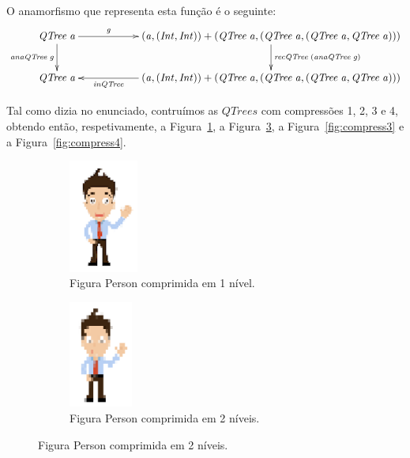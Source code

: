 \documentclass[a4paper]{article}
\newcommand{\Conid}[1]{\mathit{#1}}
\newcommand{\Varid}[1]{\mathit{#1}}
\begin{document}
\begin{enumerate}
O anamorfismo que representa esta função é o seguinte:
\begin{eqnarray}
\xymatrix@C=2cm{
    \ensuremath{\Conid{QTree}\;\Varid{a}}
        \ar[d]_-{\ensuremath{\Varid{anaQTree}\;\Varid{g}}}
        \ar[r]^-{\ensuremath{\Varid{g}}}
&
    \ensuremath{(\Varid{a},(\Conid{Int},\Conid{Int}))+(\Conid{QTree}\;\Varid{a},(\Conid{QTree}\;\Varid{a},(\Conid{QTree}\;\Varid{a},\Conid{QTree}\;\Varid{a})))}
           \ar[d]^{\ensuremath{\Varid{recQTree}\;(\Varid{anaQTree}\;\Varid{g})}}
\\
     \ensuremath{\Conid{QTree}\;\Varid{a}}
&
     \ensuremath{(\Varid{a},(\Conid{Int},\Conid{Int}))+(\Conid{QTree}\;\Varid{a},(\Conid{QTree}\;\Varid{a},(\Conid{QTree}\;\Varid{a},\Conid{QTree}\;\Varid{a})))}
           \ar[l]^-{\ensuremath{\Varid{inQTree}}}
}
\end{eqnarray}


Tal como dizia no enunciado, contruímos as \ensuremath{\Conid{QTrees}} com compressões 1, 2, 3 e 4,
obtendo então, respetivamente, a Figura~\ref{fig:compress1},
a Figura~\ref{fig:compress2}, a Figura~\ref{fig:compress3}
e a Figura~\ref{fig:compress4}.

\begin{figure}
\begin{subfigure}{0.4\textwidth}
    \begin{center}
    \includegraphics[width=0.25\textwidth]{imgs/compress1.png}
    \end{center}
    \caption{Figura Person comprimida em 1 nível.}
    \label{fig:compress1}
\end{subfigure}
\begin{subfigure}{0.4\textwidth}
    \begin{center}
    \includegraphics[width=0.23\textwidth]{imgs/compress2.png}
    \end{center}
    \caption{Figura Person comprimida em 2 níveis.}
    \label{fig:compress2}
\end{subfigure}
\end{figure}


\end{enumerate}
\end{document}
